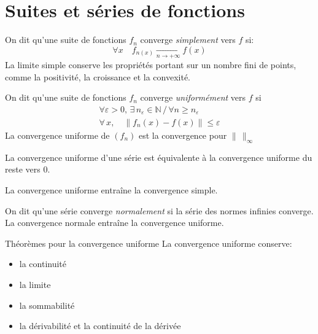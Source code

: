 \documentclass[french, a4paper, 10pt, twocolumn]{article}
\newcommand{\N}{\mathbb{N}}   %
\begin{document}
\section{Suites et séries de fonctions}
\begin{definition}
  On dit qu'une suite de fonctions \(f_{n}\) converge \emph{simplement} vers \(f\) si:
  \[\forall x\quad f_{n(x)}\xrightarrow[n\rightarrow +\infty]{} f(x)\]
  La limite simple conserve les propriétés portant sur un nombre fini de points, comme la positivité, la croissance et la convexité.
\end{definition}

\begin{definition}
  On dit qu'une suite de fonctions \(f_{n}\) converge \emph{uniformément} vers \(f\) si
  \begin{align*}
    \forall \varepsilon >0,\,\exists\, n_{\varepsilon}\in\N \,\slash\, \forall n\geqslant n_{\varepsilon} \\
    \forall\, x,\quad \left\lVert f_{n}(x)-f(x)\right\rVert \leqslant \varepsilon
  \end{align*}
  La convergence uniforme de \((f_{n})\) est la convergence pour \(\lVert\,\rVert_{\infty}\)

  La convergence uniforme d'une série est équivalente à la convergence uniforme du reste vers \(0\).

  La convergence uniforme entraîne la convergence simple.
\end{definition}

\begin{definition}
  On dit qu'une série converge \emph{normalement} si la série des normes infinies converge.
  La convergence normale entraîne la convergence uniforme.
\end{definition}

\begin{theoreme}{Théorèmes pour la convergence uniforme}
  La convergence uniforme conserve:
  \begin{itemize}
    \item la continuité
    \item la limite
    \item la sommabilité
    \item la dérivabilité et la continuité de la dérivée
  \end{itemize}
\end{theoreme}
\end{document}
